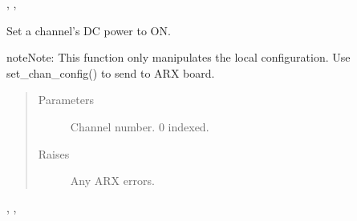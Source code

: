 \documentclass[letterpaper,10pt,english]{sphinxmanual}
\begin{document}
\begin{fulllineitems}
\begin{fulllineitems}


{\hyperref[\detokenize{index:lwautils.lwa_arx.ARX.show_chan_cfg}]{}}, {\hyperref[\detokenize{index:lwautils.lwa_arx.ARX.set_chan_cfg}]{}}, 



\end{fulllineitems}


\begin{fulllineitems}
\label{\detokenize{index:lwautils.lwa_arx.ARX.set_chan_cfg_input_dc_pwr_on}}
Set a channel’s DC power to ON.

\begin{sphinxadmonition}{note}{Note:}
This function only manipulates the local configuration.
Use set\_chan\_config() to send to ARX board.
\end{sphinxadmonition}
\begin{quote}\begin{description}
\item[{Parameters}] \leavevmode
{} \textendash{} Channel number. 0 indexed.

\item[{Raises}] \leavevmode
{} \textendash{} Any ARX errors.

\end{description}\end{quote}




{\hyperref[\detokenize{index:lwautils.lwa_arx.ARX.show_chan_cfg}]{}}, {\hyperref[\detokenize{index:lwautils.lwa_arx.ARX.set_chan_cfg}]{}}, 



\end{fulllineitems}



\end{fulllineitems}
\end{document}
